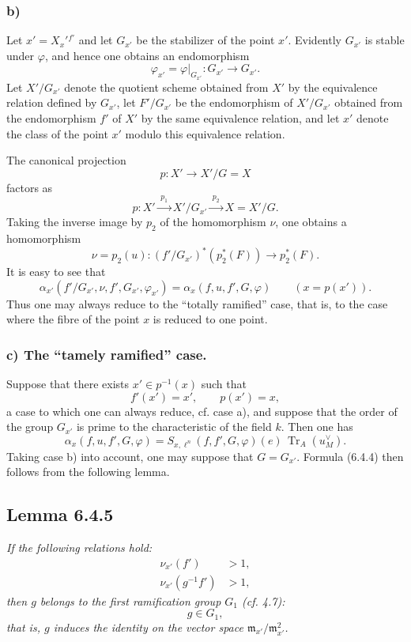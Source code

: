 \documentclass[11pt]{article}
\providecommand{\fm}{\mathfrak{m}}
\providecommand{\Tr}{\operatorname{Tr}}
\providecommand{\Tr}{\operatorname{Tr}}
\providecommand{\Tr}{\operatorname{Tr}}
\providecommand{\Tr}{\operatorname{Tr}}
\providecommand{\fm}{\mathfrak m}
\providecommand{\Tr}{\operatorname{Tr}}
\begin{document}
\subsubsection*{b)} Let $x'=X_x'{}^{f'}$ and let $G_{x'}$ be the stabilizer of the point $x'$. Evidently $G_{x'}$ is stable under $\varphi$, and hence one obtains an endomorphism
\[
\varphi_{x'}=\varphi|_{G_{x'}}:G_{x'}\longrightarrow G_{x'}.
\]
Let $X'/G_{x'}$ denote the quotient scheme obtained from $X'$ by the equivalence relation defined by $G_{x'}$, let $F'/G_{x'}$ be the endomorphism of $X'/G_{x'}$ obtained from the endomorphism $f'$ of $X'$ by the same equivalence relation, and let $x'$ denote the class of the point $x'$ modulo this equivalence relation.

The canonical projection
\[
p:X'\longrightarrow X'/G=X
\]
factors as
\[
p:X'\xrightarrow{\;p_1\;}X'/G_{x'}\xrightarrow{\;p_2\;}X=X'/G.
\]
Taking the inverse image by $p_2$ of the homomorphism $\nu$, one obtains a homomorphism
\[
\nu=p_2(u):(f'/G_{x'})^*(p_2^*(F))\longrightarrow p_2^*(F).
\]
It is easy to see that
\begin{equation}\tag{6.4.3}
\alpha_{x'}(f'/G_{x'},\nu,f',G_{x'},\varphi_{x'})
=
\alpha_x(f,u,f',G,\varphi)
\qquad (x=p(x')).
\end{equation}
Thus one may always reduce to the ``totally ramified'' case, that is, to the case where the fibre of the point $x$ is reduced to one point.

\subsubsection*{c) The ``tamely ramified'' case.} Suppose that there exists $x'\in p^{-1}(x)$ such that
\[
f'(x')=x',\qquad p(x')=x,
\]
a case to which one can always reduce, cf. case a), and suppose that the order of the group $G_{x'}$ is prime to the characteristic of the field $k$. Then one has
\begin{equation}\tag{6.4.4}
\alpha_x(f,u,f',G,\varphi)=S_{x,\ell^n}(f,f',G,\varphi)(e)\,\Tr_A(u_M^\vee).
\end{equation}
Taking case b) into account, one may suppose that $G=G_{x'}$. Formula (6.4.4) then follows from the following lemma.

\subsection*{Lemma 6.4.5}
\emph{If the following relations hold:}
\begin{align*}
\nu_{x'}(f')&>1,\\
\nu_{x'}(g^{-1}f')&>1,
\end{align*}
\emph{then $g$ belongs to the first ramification group $G_1$ (cf. 4.7):}
\[
g\in G_1,
\]
\emph{that is, $g$ induces the identity on the vector space $\fm_{x'}/\fm_{x'}^2$.}
\end{document}
